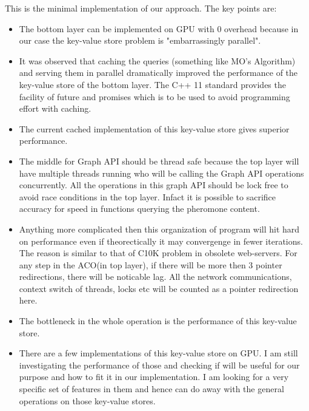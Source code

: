 \documentclass{article}
\begin{document}
This is the minimal implementation of our approach. The key points are:
\begin{itemize}
	\item The bottom layer can be implemented on GPU with 0 overhead because in our case the key-value store problem is "embarrassingly parallel".
	\item It was observed that caching the queries (something like MO's Algorithm) and serving them in parallel dramatically improved the performance of the key-value store of the bottom layer.	The C++ 11 standard provides the facility of future and promises which is to be used to avoid programming effort with caching.
	\item The current cached implementation of this key-value store gives superior performance.
	\item The middle for Graph API should be thread safe because the top layer will have multiple threads running who will be calling the Graph API operations concurrently. All the operations in this graph API should be lock free to avoid race conditions in the top layer. Infact it is possible to sacrifice accuracy for speed in functions querying the pheromone content.
	\item Anything more complicated then this organization of program will hit hard on performance even if theorectically it may convergenge in fewer iterations. The reason is similar to that of C10K problem in obsolete web-servers. For any step in the ACO(in top layer), if there will be more then 3 pointer redirections, there will be noticable lag. All the network communications, context switch of threads, locks etc will be counted as a pointer redirection here.
	\item The bottleneck in the whole operation is the performance of this key-value store.
	\item There are a few implementations of this key-value store on GPU. I am still investigating the performance of those and checking if will be useful for our purpose and how to fit it in our implementation. I am looking for a very specific set of features in them and hence can do away with the general operations on those key-value stores.
\end{itemize}
	
\end{document}
